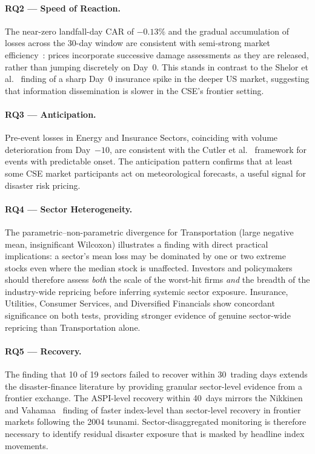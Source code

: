 \documentclass[sigconf, nonacm]{acmart}
\begin{document}
\paragraph{RQ2 --- Speed of Reaction.}
The near-zero landfall-day CAR of $-0.13\%$ and the gradual accumulation
of losses across the 30-day window are consistent with semi-strong market
efficiency~\cite{fama1969,mackinlay1997}: prices incorporate successive
damage assessments as they are released, rather than jumping discretely on
Day~0. This stands in contrast to the Shelor et al.~\cite{shelor1992}
finding of a sharp Day~0 insurance spike in the deeper US market, suggesting
that information dissemination is slower in the CSE's frontier setting.

\paragraph{RQ3 --- Anticipation.}
Pre-event losses in Energy and Insurance Sectors, coinciding with
volume deterioration from Day~$-10$, are consistent with the Cutler et
al.~\cite{cutler1989} framework for events with predictable onset. The
anticipation pattern confirms that at least some CSE market participants
act on meteorological forecasts, a useful signal for disaster risk pricing.

\paragraph{RQ4 --- Sector Heterogeneity.}
The parametric--non-parametric divergence for Transportation (large negative
mean, insignificant Wilcoxon) illustrates a finding with direct practical
implications: a sector's mean loss may be dominated by one or two extreme
stocks even where the median stock is unaffected. Investors and
policymakers should therefore assess \emph{both} the scale of the worst-hit
firms \emph{and} the breadth of the industry-wide repricing before
inferring systemic sector exposure. Insurance, Utilities, Consumer Services, and Diversified Financials show concordant significance on both tests, providing stronger evidence of genuine sector-wide repricing than Transportation alone.

\paragraph{RQ5 --- Recovery.}
The finding that 10 of 19 sectors failed to recover within 30~trading days
extends the disaster-finance literature by providing granular sector-level
evidence from a frontier exchange. The ASPI-level recovery within 40~days
mirrors the Nikkinen and Vahamaa~\cite{nikkinen2010} finding of faster
index-level than sector-level recovery in frontier markets following the
2004 tsunami. Sector-disaggregated monitoring is therefore necessary to
identify residual disaster exposure that is masked by headline index
movements.
\end{document}
